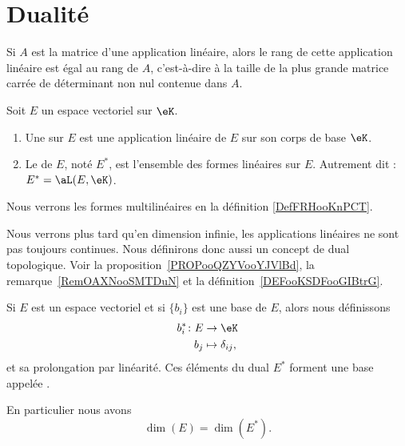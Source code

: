 \section{Dualité}

\begin{proposition} \label{PropEJBZooTNFPRj}
	Si \( A\) est la matrice d'une application linéaire, alors le rang de cette application linéaire est égal au rang de \( A \), c'est-à-dire à la taille de la plus grande matrice carrée de déterminant non nul contenue dans \( A\).
\end{proposition}

\begin{definition}  \label{DefJPGSHpn}
	Soit \( E\) un espace vectoriel sur \( \eK\).
	\begin{enumerate}
		\item
		      Une  sur \( E \) est une application linéaire de \( E \) sur son corps de base \( \eK\).
		\item
		      Le  de \( E\), noté \( E^*\), est l'ensemble des formes linéaires sur \( E\). Autrement dit : \( E^* = \aL(E,\eK)\).
	\end{enumerate}
\end{definition}
Nous verrons les formes multilinéaires en la définition \ref{DefFRHooKnPCT}.

Nous verrons plus tard qu'en dimension infinie, les applications linéaires ne sont pas toujours continues. Nous définirons donc aussi un concept de dual topologique. Voir la proposition~\ref{PROPooQZYVooYJVlBd}, la remarque~\ref{RemOAXNooSMTDuN} et la définition~\ref{DEFooKSDFooGIBtrG}.

\begin{lemmaDef}      \label{DEFooTMSEooZFtsqa}
	Si \( E\) est un espace vectoriel et si \( \{ b_i \}\) est une base de \( E\), alors nous définissons
	\begin{equation}
		\begin{aligned}
			b_i^*\colon E & \to \eK              \\
			b_j           & \mapsto \delta_{ij},
		\end{aligned}
	\end{equation}
	et sa prolongation par linéarité. Ces éléments du dual \( E^*\) forment une base appelée .

	En particulier nous avons
	\begin{equation}
		\dim(E)=\dim(E^*).
	\end{equation}
\end{lemmaDef}

